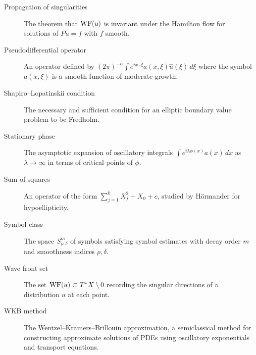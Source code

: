 \begin{description}
    \item[Propagation of singularities] The theorem that \(\operatorname{WF}(u)\)
    is invariant under the Hamilton flow for solutions of \(Pu = f\)
    with \(f\) smooth.
    \item[Pseudodifferential operator] An operator defined by
    \((2\pi)^{-n} \int e^{ix\cdot\xi} a(x,\xi) \hat u(\xi) \,d\xi\)
    where the symbol \(a(x,\xi)\) is a smooth function of moderate
    growth.
    \item[Shapiro--Lopatinskii condition] The necessary and sufficient
    condition for an elliptic boundary value problem to be Fredholm.
    \item[Stationary phase] The asymptotic expansion of oscillatory
    integrals \(\int e^{i\lambda\phi(x)} a(x)\,dx\) as
    \(\lambda \to \infty\) in terms of critical points of \(\phi\).
    \item[Sum of squares] An operator of the form
    \(\sum_{j=1}^k X_j^2 + X_0 + c\), studied by H\"ormander for
    hypoellipticity.
    \item[Symbol class] The space \(S^m_{\rho,\delta}\) of symbols
    satisfying symbol estimates with decay order \(m\) and smoothness
    indices \(\rho, \delta\).
    \item[Wave front set] The set \(\operatorname{WF}(u) \subset T^*X \setminus 0\)
    recording the singular directions of a distribution \(u\) at each
    point.
    \item[WKB method] The Wentzel--Kramers--Brillouin approximation,
    a semiclassical method for constructing approximate solutions of
    PDEs using oscillatory exponentials and transport equations.
\end{description}
